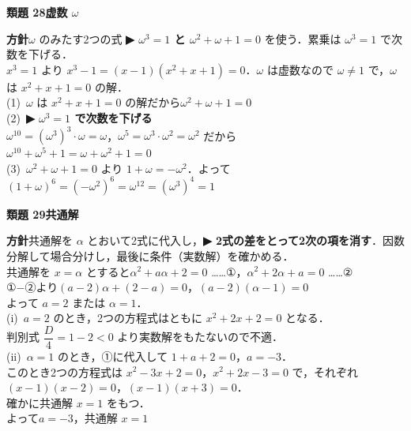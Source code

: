 \documentclass[a4paper,11pt]{ltjsarticle}
\newcommand{\ans}[2]{\Needspace{5\baselineskip}\vspace{6pt}%
  {\sffamily\bfseries 類題 #1\quad #2}\par}
\newcommand{\point}[1]{\textsf{\bfseries ▶ #1}}
\begin{document}
\ans{28}{虚数 $\omega$}
\begin{kai}
\textbf{方針}\quad $\omega$ のみたす2つの式 \point{$\omega^3=1$ と $\omega^2+\omega+1=0$} を使う．累乗は $\omega^3=1$ で次数を下げる．\\[2pt]
$x^3=1$ より $x^3-1=(x-1)(x^2+x+1)=0$．$\omega$ は虚数なので $\omega\neq1$ で，$\omega$ は $x^2+x+1=0$ の解．\\[2pt]
(1)\ $\omega$ は $x^2+x+1=0$ の解だから\quad $\omega^2+\omega+1=0$\\[2pt]
(2)\ \point{$\omega^3=1$ で次数を下げる}\\
\hspace*{1.5em}$\omega^{10}=(\omega^3)^3\cdot\omega=\omega$，\quad $\omega^5=\omega^3\cdot\omega^2=\omega^2$ だから\\
\hspace*{1.5em}$\omega^{10}+\omega^5+1=\omega+\omega^2+1=0$\\[2pt]
(3)\ $\omega^2+\omega+1=0$ より $1+\omega=-\omega^2$．よって\\
\hspace*{1.5em}$(1+\omega)^6=(-\omega^2)^6=\omega^{12}=(\omega^3)^4=1$
\end{kai}

\ans{29}{共通解}
\begin{kai}
\textbf{方針}\quad 共通解を $\alpha$ とおいて2式に代入し，\point{2式の差をとって2次の項を消す}．因数分解して場合分けし，最後に条件（実数解）を確かめる．\\[2pt]
共通解を $x=\alpha$ とすると\quad $\alpha^2+a\alpha+2=0$ ……①，\quad $\alpha^2+2\alpha+a=0$ ……②\\
①$-$②より\quad $(a-2)\alpha+(2-a)=0$，\quad $(a-2)(\alpha-1)=0$\\
よって $a=2$ または $\alpha=1$．\\[2pt]
(i)\ $a=2$ のとき，2つの方程式はともに $x^2+2x+2=0$ となる．\\
\hspace*{1.5em}判別式 $\dfrac D4=1-2<0$ より実数解をもたないので不適．\\
(ii)\ $\alpha=1$ のとき，①に代入して $1+a+2=0$，$a=-3$．\\
\hspace*{1.5em}このとき2つの方程式は $x^2-3x+2=0$，$x^2+2x-3=0$ で，それぞれ $(x-1)(x-2)=0$，$(x-1)(x+3)=0$．\\
\hspace*{1.5em}確かに共通解 $x=1$ をもつ．\\[2pt]
よって\quad $a=-3$，\quad 共通解 $x=1$
\end{kai}
\end{document}
